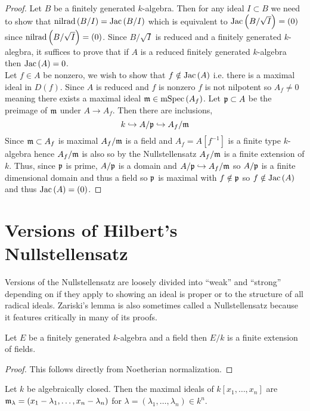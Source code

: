 \documentclass[12pt]{article}
\begin{document}
\begin{proof}
Let $B$ be a finitely generated $k$-algebra. Then for any ideal $I \subset B$ we need to show that $\mathrm{nilrad}\left( B / I \right) = \mathrm{Jac}\left( B / I \right)$ which is equivalent to $\mathrm{Jac}\left( B / \sqrt{I} \right) = (0)$ since $\mathrm{nilrad}\left( B / \sqrt{I} \right) = (0)$. Since $B / \sqrt{I}$ is reduced and a finitely generated $k$-alegbra, it suffices to prove that if $A$ is a reduced finitely generated $k$-algebra then $\mathrm{Jac}\left( A \right) = 0$.
\bigskip\\
Let $f \in A$ be nonzero, we wish to show that $f \notin \mathrm{Jac}\left( A \right)$ i.e. there is a maximal ideal in $D(f)$. Since $A$ is reduced and $f$ is nonzero $f$ is not nilpotent so $A_f \neq 0$ meaning there exists a maximal ideal $\mathfrak{m} \in \mathrm{mSpec}\left( A_f \right)$. Let $\mathfrak{p} \subset A$ be the preimage of $\mathfrak{m}$ under $A \to A_f$. Then there are inclusions,
\[ k \hookrightarrow A / \mathfrak{p} \hookrightarrow A_f / \mathfrak{m} \]
Since $\mathfrak{m} \subset A_f$ is maximal $A_f / \mathfrak{m}$ is a field and $A_f = A[f^{-1}]$ is a finite type $k$-algebra hence $A_f / \mathfrak{m}$ is also so by the Nullstellensatz $A_f / \mathfrak{m}$ is a finite extension of $k$. Thus, since $\mathfrak{p}$ is prime, $A / \mathfrak{p}$ is a domain and $A / \mathfrak{p} \hookrightarrow A_f / \mathfrak{m}$ so $A / \mathfrak{p}$ is a finite dimensional domain and thus a field so $\mathfrak{p}$ is maximal with $f \notin \mathfrak{p}$ so $f \notin \mathrm{Jac}\left( A \right)$ and thus $\mathrm{Jac}\left( A \right) = (0)$. 
\end{proof}


\section{Versions of Hilbert's Nullstellensatz}

\begin{rmk}
Versions of the Nullstellensatz are loosely divided into ``weak'' and ``strong'' depending on if they apply to showing an ideal is proper or to the structure of all radical ideals. Zariski's lemma is also sometimes called a Nullstellensatz because it features critically in many of its proofs. 
\end{rmk}

\begin{lemma}
Let $E$ be a finitely generated $k$-algebra and a field then $E / k$ is a finite extension of fields.
\end{lemma}

\begin{proof}
This follows directly from Noetherian normalization.
\end{proof}

\begin{thm}
Let $k$ be algebraically closed. Then the maximal ideals of $k[x_1, \dots, x_n]$ are $\mathfrak{m}_\lambda = (x_1 - \lambda_1, \dots, x_n - \lambda_n)$ for $\lambda = (\lambda_1, \dots, \lambda_n) \in k^n$.
\end{thm}
\end{document}
